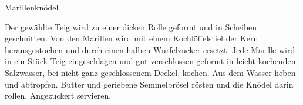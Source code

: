 \begin{recipe}{Marillenknödel}
%
%
%
%
%

\begin{ingredients}
\end{ingredients}

\begin{instructions}
    Der gewählte Teig wird zu einer dicken Rolle geformt und in Scheiben geschnitten.
    Von den Marillen wird mit einem Kochlöffelstiel der Kern herausgestochen und durch einen halben Würfelzucker ersetzt.
    Jede Marille wird in ein Stück Teig eingeschlagen und gut verschlossen geformt in leicht kochendem Salzwasser, bei nicht ganz geschlossenem Deckel, kochen.
    Aus dem Wasser heben und abtropfen.
    Butter und geriebene Semmelbrösel rösten und die Knödel darin rollen.
    Angezuckert servieren.
\end{instructions}
\end{recipe}
